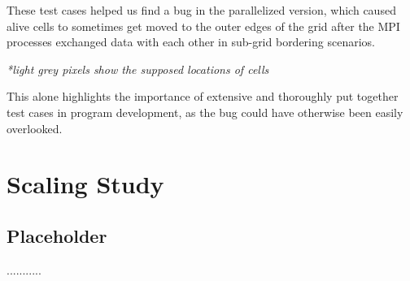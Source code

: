 \documentclass[11pt]{article}
\begin{document}
These test cases helped us find a bug in the parallelized version, which caused alive cells to sometimes get moved to the outer edges of the grid after the MPI processes exchanged data with each other in sub-grid bordering scenarios.
\begin{center}

    \vspace{-0.25cm} %
    \textit{*light grey pixels show the supposed locations of cells}
\end{center}

This alone highlights the importance of extensive and thoroughly put together test cases in program development, as the bug could have otherwise been easily overlooked.

\section{Scaling Study}

\subsection{Placeholder}
...........
\end{document}
